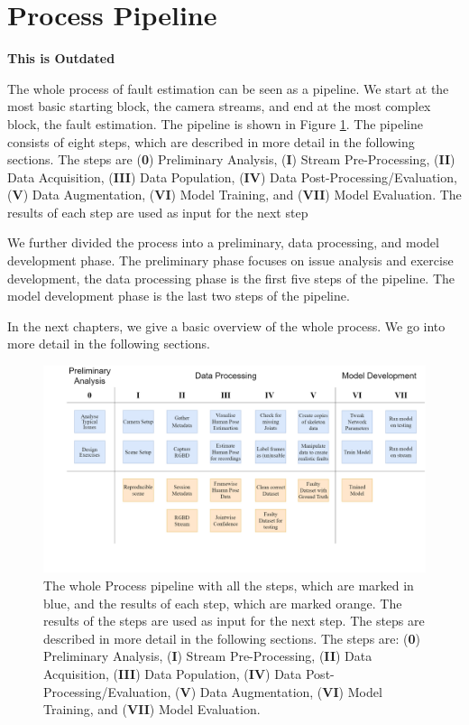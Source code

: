 \section{Process Pipeline}
\label{sec:process_pipeline}

\textbf{This is Outdated}

The whole process of fault estimation can be seen as a pipeline. We start at the most basic starting block, the camera streams, and end at the most complex block, the fault estimation. The pipeline is shown in Figure \ref{fig:process_pipeline}. The pipeline consists of eight steps, which are described in more detail in the following sections. The steps are (\textbf{0}) Preliminary Analysis, (\textbf{I}) Stream Pre-Processing, (\textbf{II}) Data Acquisition, (\textbf{III}) Data Population, (\textbf{IV}) Data Post-Processing/Evaluation, (\textbf{V}) Data Augmentation, (\textbf{VI}) Model Training, and (\textbf{VII}) Model Evaluation. The results of each step are used as input for the next step

We further divided the process into a preliminary, data processing, and model development phase. The preliminary phase focuses on issue analysis and exercise development, the data processing phase is the first five steps of the pipeline. The model development phase is the last two steps of the pipeline.

In the next chapters, we give a basic overview of the whole process. We go into more detail in the following sections.

\begin{figure}[ht]
    \centering
    \includegraphics[width=\textwidth]{figures/ProcessingPipeline/ProcessingPipeline.png}
    \caption[Process Pipeline with all steps]{The whole Process pipeline with all the steps, which are marked in blue, and the results of each step, which are marked orange. The results of the steps are used as input for the next step. The steps are described in more detail in the following sections. The steps are: (\textbf{0}) Preliminary Analysis, (\textbf{I}) Stream Pre-Processing, (\textbf{II}) Data Acquisition, (\textbf{III}) Data Population, (\textbf{IV}) Data Post-Processing/Evaluation, (\textbf{V}) Data Augmentation, (\textbf{VI}) Model Training, and (\textbf{VII}) Model Evaluation.}
    \label{fig:process_pipeline}
\end{figure}
